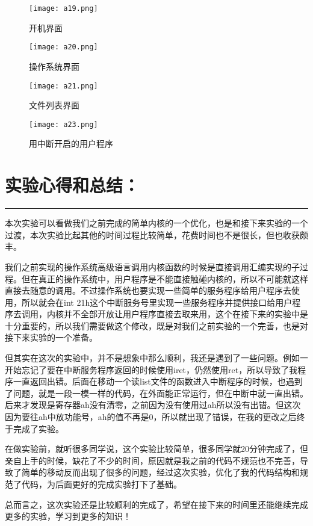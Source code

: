 \documentclass[UTF8]{article}
\newcommand{\bg}{\colorbox{gray!13}}%
\begin{document}
\begin{enumerate}[1)]
  \begin{figure}[htbp]
			\centering
			\texttt{[image: a19.png]}
			\caption{开机界面}
	\end{figure}
	 \begin{figure}[htbp]
			\centering
			\texttt{[image: a20.png]}
			\caption{操作系统界面}
		\end{figure}
		\begin{figure}[htbp]
			\centering
			\texttt{[image: a21.png]}
			\caption{文件列表界面}
		\end{figure}
		\begin{figure}[htbp]
			\centering
			\texttt{[image: a23.png]}
			\caption{用中断开启的用户程序}
		\end{figure}

	
  \end{enumerate}

\newpage
\section{实验心得和总结：}
\noindent\rule[0.2\baselineskip]{\textwidth}{0.5pt}
\heiti
\par 本次实验可以看做我们之前完成的简单内核的一个优化，也是和接下来实验的一个过渡，本次实验比起其他的时间过程比较简单，花费时间也不是很长，但也收获颇丰。
\par 我们之前实现的操作系统高级语言调用内核函数的时候是直接调用汇编实现的子过程。但在真正的操作系统中，用户程序是不能直接触碰内核的，所以不可能就这样直接去随意的调用。不过操作系统也要实现一些简单的服务程序给用户程序去使用，所以就会在\bg{int 21h}这个中断服务号里实现一些服务程序并提供接口给用户程序去调用，内核并不全部开放让用户程序直接去取来用，这个在接下来的实验中是十分重要的，所以我们需要做这个修改，既是对我们之前实验的一个完善，也是对接下来实验的一个准备。
\par 但其实在这次的实验中，并不是想象中那么顺利，我还是遇到了一些问题。例如一开始忘记了要在中断服务程序返回的时候使用iret，仍然使用ret，所以导致了我程序一直返回出错。后面在移动一个读list文件的函数进入中断程序的时候，也遇到了问题，就是一段一模一样的代码，在外面能正常运行，但在中断中就一直出错。后来才发现是寄存器ah没有清零，之前因为没有使用过ah所以没有出错。但这次因为要往ah中放功能号，ah的值不再是0，所以就出现了错误，在我的更改之后终于完成了实验。
\par 在做实验前，就听很多同学说，这个实验比较简单，很多同学就20分钟完成了，但亲自上手的时候，缺花了不少的时间，原因就是我之前的代码不规范也不完善，导致了简单的移动反而出现了很多的问题，经过这次实验，优化了我的代码结构和规范了代码，为后面更好的完成实验打下了基础。
\par 总而言之，这次实验还是比较顺利的完成了，希望在接下来的时间里还能继续完成更多的实验，学习到更多的知识！
\end{document}
